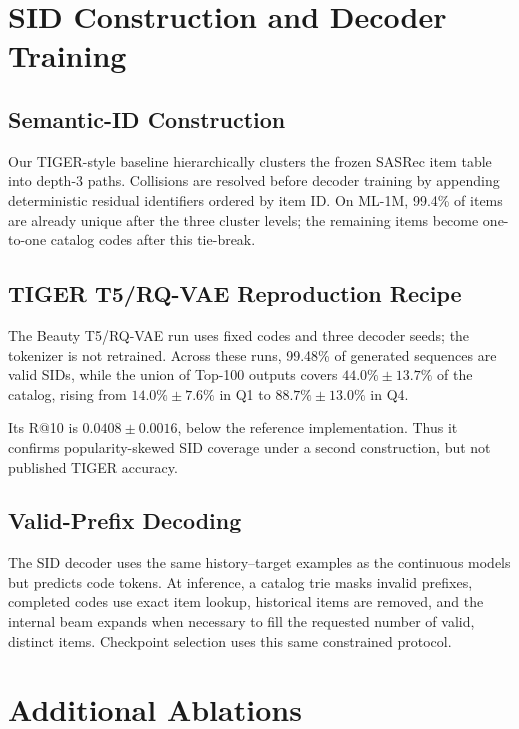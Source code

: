 \documentclass[letterpaper]{article}
\begin{document}
\section{SID Construction and Decoder Training}
\label{app:sid}

\subsection{Semantic-ID Construction}
\label{app:sid_construction}

Our TIGER-style baseline hierarchically clusters the frozen SASRec item table
into depth-3 paths. Collisions are resolved before decoder training by
appending deterministic residual identifiers ordered by item ID. On ML-1M,
99.4\% of items are already unique after the three cluster levels; the
remaining items become one-to-one catalog codes after this tie-break.

\subsection{TIGER T5/RQ-VAE Reproduction Recipe}
\label{app:tiger_recipe}

The Beauty T5/RQ-VAE run uses fixed codes and three decoder seeds; the
tokenizer is not retrained.
Across these runs, 99.48\% of generated sequences are valid SIDs, while the
union of Top-100 outputs covers \(44.0\%\pm13.7\%\) of the catalog, rising
from \(14.0\%\pm7.6\%\) in Q1 to \(88.7\%\pm13.0\%\) in Q4.

Its R@10 is \(0.0408\pm0.0016\), below the reference implementation. Thus it
confirms popularity-skewed SID coverage under a second construction, but not
published TIGER accuracy.

\subsection{Valid-Prefix Decoding}
\label{app:tiger_dataloader}

The SID decoder uses the same history--target examples as the continuous
models but predicts code tokens. At inference, a catalog trie masks invalid
prefixes, completed codes use exact item lookup, historical items are removed,
and the internal beam expands when necessary to fill the requested number of
valid, distinct items. Checkpoint selection uses this same constrained
protocol.

\section{Additional Ablations}
\label{app:ablations}
\end{document}
